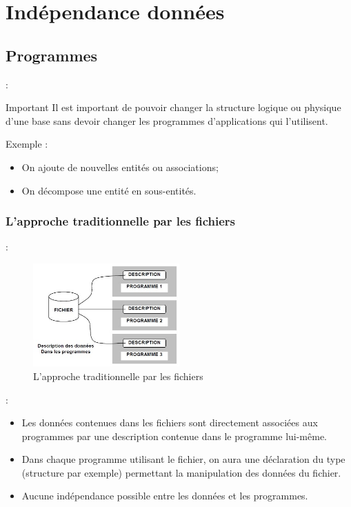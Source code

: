 \documentclass[10pt]{beamer}
\begin{document}
\section{Indépendance données}
\subsection{Programmes}
\tocsss
\begin{frame}{\secname : \subsecname}
    \begin{alertblock}{Important}
        Il est important de pouvoir changer la structure logique ou physique d’une base sans devoir changer les programmes d’applications qui l’utilisent.
    \end{alertblock}
    Exemple :

    \begin{itemize}
        \item On ajoute de nouvelles entités ou associations;
        \item On décompose une entité en sous-entités.
    \end{itemize}
\end{frame}


\subsubsection{L’approche traditionnelle par les fichiers}
\begin{frame}{\subsecname : \subsubsecname}
    \begin{figure}
        \begin{center}
            \includegraphics[width=0.5\textwidth]{../assets/img/par_fichier.jpg}
            \caption{L’approche traditionnelle par les fichiers}
            \label{Fig:par_fichier}
        \end{center}
    \end{figure}
\end{frame}



\begin{frame}{\subsecname : \subsubsecname}
    \begin{itemize}
        \item Les données contenues dans les fichiers sont directement associées aux programmes par une description contenue dans le programme lui-même.
        \item Dans chaque programme utilisant le fichier, on aura une déclaration du type (structure par exemple) permettant la manipulation des données du fichier.
        \item Aucune indépendance possible entre les données et les programmes.
    \end{itemize}
\end{frame}
\end{document}
